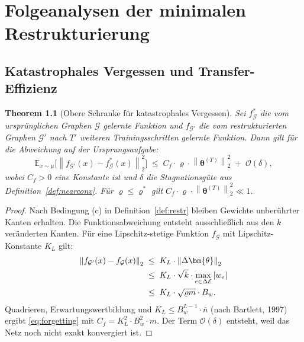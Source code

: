 ﻿\documentclass[12pt, a4paper, openany]{report}
\newtheorem{theorem}{Theorem}[chapter]
\newcommand{\E}{\mathbb{E}}
\newcommand{\calG}{\mathcal{G}}
\newcommand{\calE}{\mathcal{E}}
\newcommand{\norms}[1]{\left\|#1\right\|}
\begin{document}
\chapter{Folgeanalysen der minimalen Restrukturierung}
\label{chap:consequences}

\section{Katastrophales Vergessen und Transfer-Effizienz}
\label{sec:forgetting}

\begin{theorem}[Obere Schranke für katastrophales Vergessen]
\label{thm:forgetting}
Sei $f^*_{\calG}$ die vom ursprünglichen Graphen $\calG$ gelernte Funktion
und $f_{\calG'}$ die vom restrukturierten Graphen $\calG'$ nach
$T'$ weiteren Trainingsschritten gelernte Funktion.  Dann gilt für die
Abweichung auf der Ursprungsaufgabe:
\begin{equation}
  \label{eq:forgetting}
  \E_{x \sim \mu}\bigl[\norms{f_{\calG'}(x) - f^*_{\calG}(x)}_2^2\bigr]
  \;\leq\;
  C_f \cdot \varrho \cdot \norms{\bm{\theta}^{(T)}}_2^2
  \;+\; \mathcal{O}(\delta),
\end{equation}
wobei $C_f > 0$ eine Konstante ist und $\delta$ die Stagnationsgüte aus
Definition~\ref{def:nearconv}.  Für $\varrho \leq \varrho^*$ gilt
$C_f \cdot \varrho \cdot \norms{\bm{\theta}^{(T)}}_2^2 \ll 1$.
\end{theorem}

\begin{proof}
Nach Bedingung (c) in Definition~\ref{def:restr} bleiben Gewichte
unberührter Kanten erhalten.  Die Funktionsabweichung entsteht ausschließlich
aus den $k$ veränderten Kanten.  Für eine Lipschitz-stetige Funktion
$f_{\calG}$ mit Lipschitz-Konstante $K_L$ gilt:
\begin{align}
  \norms{f_{\calG'}(x) - f_{\calG}(x)}_2
  &\;\leq\; K_L \cdot \norms{\Delta\bm{\theta}}_2 \notag \\
  &\;\leq\; K_L \cdot \sqrt{k} \cdot \max_{e \in \Delta\calE} |w_e| \notag \\
  &\;\leq\; K_L \cdot \sqrt{\varrho m} \cdot B_w.
\end{align}
Quadrieren, Erwartungswertbildung und $K_L \leq B_w^{L-1} \cdot \bar{n}$
(nach Bartlett, 1997) ergibt \eqref{eq:forgetting} mit
$C_f = K_L^2 \cdot B_w^2 \cdot m$.  Der Term $\mathcal{O}(\delta)$
entsteht, weil das Netz noch nicht exakt konvergiert ist.
\end{proof}
\end{document}
